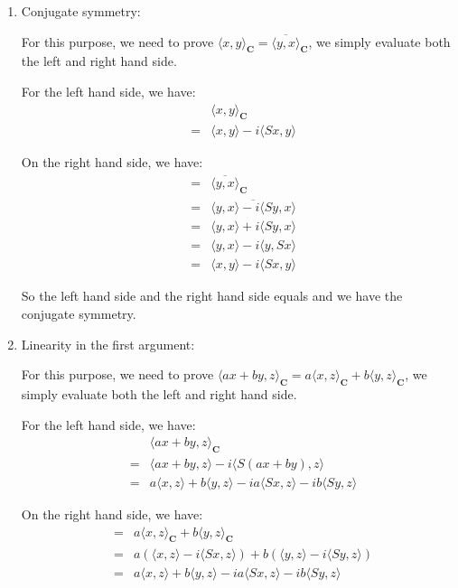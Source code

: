 \begin{enumerate}
    \item{
        Conjugate symmetry:

        For this purpose, we need to prove $ \langle x, y\rangle_\mathbf{C} = \overline{\langle y, x\rangle}_\mathbf{C}$, we simply evaluate both the left and right hand side.

         For the left hand side, we have:
        \begin{eqnarray*}
          & & \langle x, y\rangle_\mathbf{C} \\
          &=& \langle x, y\rangle - i \langle Sx, y\rangle
        \end{eqnarray*}

        On the right hand side, we have:
        \begin{eqnarray*}
          &=& \overline{\langle y, x\rangle}_\mathbf{C} \\
          &=& \overline{\langle y, x\rangle - i \langle Sy, x\rangle} \\
          &=& \langle y, x\rangle + i \langle Sy, x\rangle \\
          &=& \langle y, x\rangle - i \langle y, Sx\rangle \\
          &=& \langle x, y\rangle - i \langle Sx, y\rangle
        \end{eqnarray*}

        So the left hand side and the right hand side equals and we have the conjugate symmetry.
    }
    \item{
        Linearity in the first argument:

        For this purpose, we need to prove $ \langle ax+by, z\rangle_\mathbf{C} = a\langle x, z\rangle_\mathbf{C} + b\langle y, z\rangle_\mathbf{C} $, we simply evaluate both the left and right hand side.

         For the left hand side, we have:
        \begin{eqnarray*}
          & & \langle ax + by, z\rangle_\mathbf{C} \\
          &=& \langle ax + by, z\rangle - i \langle S(ax+by), z\rangle \\
          &=& a\langle x, z\rangle + b\langle y, z\rangle - i a\langle Sx, z\rangle - i b\langle Sy, z\rangle
        \end{eqnarray*}

        On the right hand side, we have:
        \begin{eqnarray*}
          &=& a\langle x, z\rangle_\mathbf{C} + b\langle y, z\rangle_\mathbf{C} \\
          &=& a(\langle x, z\rangle - i \langle Sx, z\rangle) + b(\langle y, z\rangle - i \langle Sy, z\rangle) \\
          &=& a\langle x, z\rangle + b\langle y, z\rangle - i a\langle Sx, z\rangle - i b\langle Sy, z\rangle
        \end{eqnarray*}

}
\end{enumerate}
